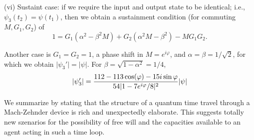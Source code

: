 (vi) Sustaint case:
if we require the input and output state to be identical; i.e.,
$\psi_3(t_2)=\psi (t_1)$,
then we obtain a sustainment condition (for commuting $M,G_1,G_2$) of
\begin{equation}
\label{eq38}
1=
G_1(\alpha^2-\beta^2 M)+
G_2(\alpha^2M-\beta^2 )- MG_1G_2.
\end{equation}

\noindent
Another  case is $G_1=G_2=1$, a phase shift in $M=e^{i\varphi}$, and
$\alpha=\beta=1/\sqrt{2}$, for which we obtain
$\vert \psi_3'\vert=\vert \psi \vert$. For $\beta=\sqrt{1-\alpha^2}=1/4$,
\begin{equation}
\label{eq39}
\vert \psi_3'\vert=
{112-113\cos(\varphi)-15i\sin{\varphi}\over
54\vert 1-7e^{i\varphi}/8\vert^2}
\vert \psi \vert
\end{equation}


We summarize by stating that the structure of a quantum time travel through a
Mach-Zehnder device is rich and unexpectedly elaborate.
This suggests totally new szenarios for the possibility of free will
and the capacities available to an agent acting in such a time loop.




%
%
%

